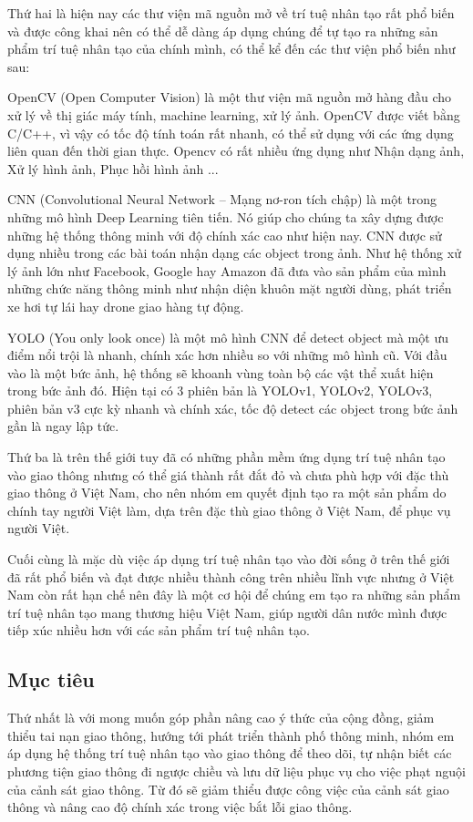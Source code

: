 \documentclass[14pt,oneside,a4paper]{extreport}
\begin{document}
Thứ hai là hiện nay các thư viện mã nguồn mở về trí tuệ nhân tạo rất phổ biến và được công khai nên có thể dễ dàng áp dụng chúng để tự tạo ra những sản phẩm trí tuệ nhân tạo của chính mình, có thể kể đến các thư viện phổ biến như sau:

OpenCV (Open Computer Vision) là một thư viện mã nguồn mở hàng đầu cho xử lý về thị giác máy tính, machine learning, xử lý ảnh. OpenCV được viết bằng C/C++, vì vậy có tốc độ tính toán rất nhanh, có thể sử dụng với các ứng dụng liên quan đến thời gian thực. Opencv có rất nhiều ứng dụng như Nhận dạng ảnh, Xử lý hình ảnh, Phục hồi hình ảnh ...

CNN (Convolutional Neural Network – Mạng nơ-ron tích chập) là một trong những mô hình Deep Learning tiên tiến. Nó giúp cho chúng ta xây dựng được những hệ thống thông minh với độ chính xác cao như hiện nay. CNN được sử dụng nhiều trong các bài toán nhận dạng các object trong ảnh. Như hệ thống xử lý ảnh lớn như Facebook, Google hay Amazon đã đưa vào sản phẩm của mình những chức năng thông minh như nhận diện khuôn mặt người dùng, phát triển xe hơi tự lái hay drone giao hàng tự động.

YOLO (You only look once) là một mô hình CNN để detect object mà một ưu điểm nổi trội là nhanh, chính xác hơn nhiều so với những mô hình cũ. Với đầu vào là một bức ảnh, hệ thống sẽ khoanh vùng toàn bộ các vật thể xuất hiện trong bức ảnh đó. Hiện tại có 3 phiên bản là YOLOv1, YOLOv2, YOLOv3, phiên bản v3 cực kỳ nhanh và chính xác, tốc độ detect các object trong bức ảnh gần là ngay lập tức.

Thứ ba là trên thế giới tuy đã có những phần mềm ứng dụng trí tuệ nhân tạo vào giao thông nhưng có thể giá thành rất đắt đỏ và chưa phù hợp với đặc thù giao thông ở Việt Nam, cho nên nhóm em quyết định tạo ra một sản phẩm do chính tay người Việt làm, dựa trên đặc thù giao thông ở Việt Nam, để phục vụ người Việt.

Cuối cùng là mặc dù việc áp dụng trí tuệ nhân tạo vào đời sống ở trên thế giới đã rất phổ biến và đạt được nhiều thành công trên nhiều lĩnh vực nhưng ở Việt Nam còn rất hạn chế nên đây là một cơ hội để chúng em tạo ra những sản phẩm trí tuệ nhân tạo mang thương hiệu Việt Nam, giúp người dân nước mình được tiếp xúc nhiều hơn với các sản phẩm trí tuệ nhân tạo.

\subsection{Mục tiêu}
Thứ nhất là với mong muốn góp phần nâng cao ý thức của cộng đồng, giảm thiểu tai nạn giao thông, hướng tới phát triển thành phố thông minh, nhóm em áp dụng hệ thống trí tuệ nhân tạo vào giao thông để theo dõi, tự nhận biết các phương tiện giao thông đi ngược chiều và lưu dữ liệu phục vụ cho việc phạt nguội của cảnh sát giao thông. Từ đó sẽ giảm thiểu được công việc của cảnh sát giao thông và nâng cao độ chính xác trong việc bắt lỗi giao thông.
\end{document}
